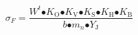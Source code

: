 \[{\sigma }_F\mathrm{=}\frac{W^t\mathrm{\bullet }K_{\mathrm{O}}\mathrm{\bullet }K_{\mathrm{V}}\mathrm{\bullet }K_{\mathrm{S}}\mathrm{\bullet }K_{\mathrm{H}}\mathrm{\bullet }K_{\mathrm{B}}}{b\mathrm{\bullet }m_n\mathrm{\bullet }Y_{\mathrm{J}}}\]
